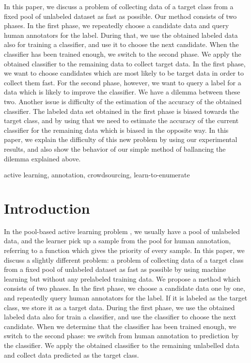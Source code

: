 \documentclass{deime}
\begin{document}
\pagestyle{empty}

\begin{eabstract}
In this paper, we discuss a problem of collecting data of a target
class from a fixed pool of unlabeled dataset as fast as possible.  Our
method consists of two phases.  In the first phase, we repeatedly
choose a candidate data and query human annotators for the label.
During that, we use the obtained labeled data also for training a
classifier, and use it to choose the next candidate.  When the
classifier has been trained enough, we switch to the second phase.  We
apply the obtained classifier to the remaining data to collect target
data.
%
In the first phase, we want to choose candidates which are most likely
to be target data in order to collect them fast.  For the second
phase, however, we want to query a label for a data which is likely to
improve the classifier.  We have a dilemma between these two.  Another
issue is difficulty of the estimation of the accuracy of the obtained
classifier.  The labeled data set obtained in the first phase is
biased towards the target class, and by using that we need to estimate
the accuracy of the current classifier for the remaining data which is
biased in the opposite way.
%
In this paper, we explain the difficulty of this new problem by using
our experimental results, and also show the behavior of our simple
method of ballancing the dilemma explained above.
\end{eabstract}

\begin{ekeyword}
active learning, annotation, crowdsourcing, learn-to-enumerate
\end{ekeyword}

\maketitle

\section{Introduction}
\label{sec:intro}

In the pool-based active learning problem \cite{survey}, we usually
have a pool of unlabeled data, and the learner pick up a sample from
the pool for human annotation, referring to a function which gives the
priority of every sample.  In this paper, we discuss a slightly
different problem: a problem of collecting data of a target class from
a fixed pool of unlabeled dataset as fast as possible by using machine
learning but without any prelabeled training data.  We propose a
method which consists of two phases.  In the first phase, we choose a
candidate data one by one, and repeatedly query human annotators for
the label.  If it is labeled as the target class, we store it as a
target data.  During the first phase, we use the obtained labeled data
also for train a classifier, and use the classifier to choose the next
candidate.  When we determine that the classifier has been trained
enough, we switch to the second phase: we switch from human annotation
to prediction by the classifier.  We apply the obtained classifier to
the remaining unlabelled data and collect data predicted as the target
class.
\end{document}
